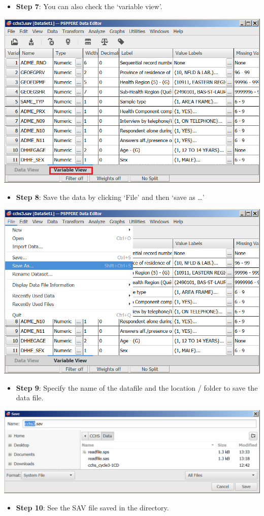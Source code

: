 \documentclass[
]{book}
\providecommand{\tightlist}{%
  \setlength{\itemsep}{0pt}\setlength{\parskip}{0pt}}
\begin{document}
\begin{itemize}
\tightlist
\item
  \textbf{Step 7}: You can also check the `variable view'.
\end{itemize}

\includegraphics[width=0.65\linewidth]{images/abacus37}

\begin{itemize}
\tightlist
\item
  \textbf{Step 8}: Save the data by clicking `File' and then `save as \ldots{}'
\end{itemize}

\includegraphics[width=0.65\linewidth]{images/abacus38}

\begin{itemize}
\tightlist
\item
  \textbf{Step 9}: Specify the name of the datafile and the location / folder to save the data file.
\end{itemize}

\includegraphics[width=0.65\linewidth]{images/abacus39}

\begin{itemize}
\tightlist
\item
  \textbf{Step 10}: See the SAV file saved in the directory.
\end{itemize}
\end{document}
